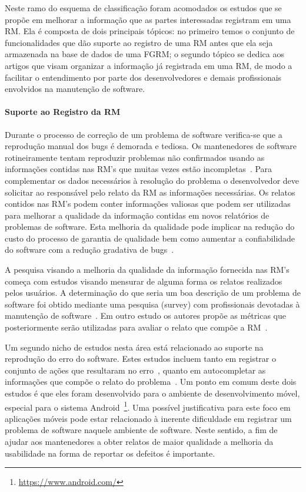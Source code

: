 Neste ramo do esquema de classificação foram acomodados os estudos que se propõe
em melhorar a informação que as partes interessadas registram em uma RM\@. Ela é
composta de dois principais tópicos: no primeiro temos o conjunto de
funcionalidades que dão suporte ao registro de uma RM antes que ela seja
armazenada na base de dados de uma FGRM\@; o segundo tópico se dedica aos
artigos que visam organizar a informação já registrada em uma RM, de modo a
facilitar o entendimento por parte dos desenvolvedores e demais profissionais
envolvidos na manutenção de software.

\paragraph{Suporte ao Registro da RM}

Durante o processo de correção de um problema de software verifica-se que a
reprodução manual dos bugs é demorada e tediosa. Os mantenedores de software
rotineiramente tentam reproduzir problemas não confirmados usando as informações
contidas nas RM's que muitas vezes estão
incompletas~\cite{White:2015:GRR:2820282.2820291}. Para complementar os dados
necessários à resolução do problema o desenvolvedor deve solicitar ao
responsável pelo relato da RM as informações necessárias. Os relatos contidos
nas RM's podem conter informações valiosas que podem ser utilizadas para
melhorar a qualidade da informação contidas em novos relatórios de problemas de
software. Esta melhoria da qualidade pode implicar na redução do custo do
processo de garantia de qualidade bem como aumentar a confiabilidade do software
com a redução gradativa de bugs~\cite{Tu:2014:MQI:2677832.2677844}.

A pesquisa visando a melhoria da qualidade da informação fornecida nas RM's
começa com estudos visando mensurar de alguma forma os relatos realizados pelos
usuários. A determinação do que seria um boa descrição de um problema de software
foi obtido mediante uma pesquisa (survey) com profissionais devotadas à
manutenção de software~\cite{Bettenburg2008a}. Em outro estudo os autores propõe
as métricas que posteriormente serão utilizadas para avaliar o relato que compõe
a RM~\cite{Tu:2014:MQI:2677832.2677844}.

Um segundo nicho de estudos  nesta área está relacionado ao suporte na
reprodução do erro do software. Estes estudos incluem tanto em registrar o
conjunto de ações que resultaram no erro~\cite{White:2015:GRR:2820282.2820291},
quanto em autocompletar as informações que compõe o relato do
problema~\cite{moran2015auto}. Um ponto em comum deste dois estudos é que eles
foram desenvolvido para o ambiente de desenvolvimento móvel, especial para o
sistema Android~\footnote{\url{https://www.android.com/}}. Uma possível
justificativa para este foco em aplicações móveis pode estar relacionado à
inerente dificuldade em registrar um problema de software naquele ambiente de
software. Neste sentido, a fim de ajudar aos mantenedores a obter relatos de
maior qualidade a melhoria da usabilidade na forma de reportar os defeitos é
importante.

